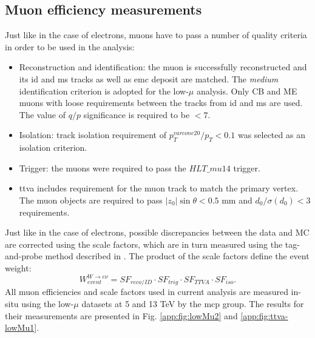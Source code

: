     \subsection{Muon efficiency measurements}
    Just like in the case of electrons, muons have to pass a number of quality criteria in order to be used in the analysis:
    \begin{itemize}
    	\item Reconstruction and identification: the muon is successfully reconstructed and its \gls{id} and \gls{ms} tracks as well as \gls{emc} deposit are matched. The \textit{medium} identification criterion is adopted for the low-$\mu$ analysis. Only CB and ME muons with loose requirements between the tracks from \gls{id} and \gls{ms} are used. The value of $q/p$ significance is required to be $<7$. 
    	\item Isolation: track isolation requirement of $p_T^{varcone20}/p_T<0.1$ was selected as an isolation criterion. 
    	\item Trigger: the muons were required to pass the $HLT\_mu14$ trigger.
    	\item \gls{ttva} includes requirement for the muon track to match the primary vertex. The muon objects are required to pass $|z_0|\sin{\theta}<0.5$ mm and $d_0/\sigma(d_0)<3$ requirements.
    \end{itemize}
	Just like in the case of electrons, possible discrepancies between the data and MC are corrected using the scale factors, which are in turn measured using the tag-and-probe method described in \cite{Koehler:2665704}. The product of the scale factors define the event weight: 
	\begin{equation*}
	W_{event}^{W\rightarrow e\nu}=SF_{reco/ID} \cdot SF_{trig} \cdot SF_{TTVA} \cdot SF_{iso}.
	\end{equation*}
	All muon efficiencies and scale factors used in current analysis are measured in-situ using the low-$\mu$ datasets at 5 and 13 TeV by the \gls{mcp} group. The results for their measurements are presented in Fig. \ref{app:fig:lowMu2} and \ref{app:fig:ttva-lowMu1}.
	
